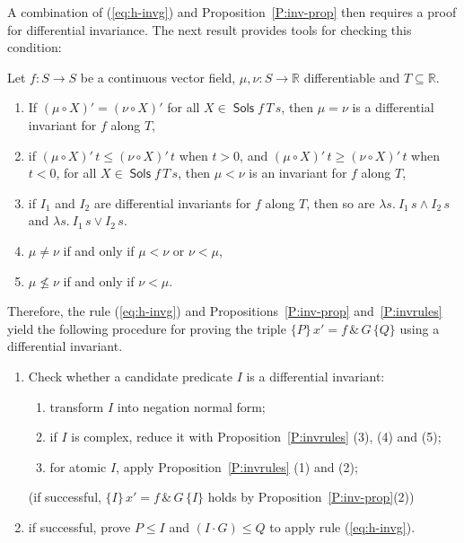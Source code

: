 \documentclass[envcountsames]{llncs}
\newcommand{\reals}{\mathbb{R}}
\newcommand{\Sols}{\mathop{\mathsf{Sols}}}
\begin{document}
A combination of (\ref{eq:h-invg}) and Proposition~\ref{P:inv-prop} then requires a proof for differential invariance. The next result provides tools for checking this condition:

\begin{proposition}\label{P:invrules}
  Let $f:S\to S$ be a continuous vector field, $\mu,\nu:S\to\reals$
  differentiable and $T\subseteq \reals$. 
\begin{enumerate}
\item If $(\mu\circ X)' =(\nu\circ X)'$ for all $X\in \Sols f\, T\, s$, then $\mu = \nu$ is a differential invariant for $f$ along $T$,
\item if $(\mu\circ X)'\, t\leq(\nu\circ X)'\, t$ when $t> 0$, and $(\mu\circ X)'\, t\geq(\nu\circ X)'\, t$ when $t< 0$, for all $X\in \Sols f\, T\, s$,
  then $\mu < \nu$ is an invariant for $f$ along $T$,
\item if $I_1$ and $I_2$ are differential invariants for $f$ along $T$, then so are $\lambda s.\ I_1\, s \land I_2\, s$ and $\lambda s.\ I_1\, s \lor I_2\, s$.
\item $\mu\neq \nu$ if and only if $\mu < \nu$ or $\nu < \mu$,
\item $\mu \not\le \nu$ if and only if $\nu < \mu$.
\end{enumerate}
\end{proposition}

Therefore, the rule (\ref{eq:h-invg}) and Propositions~\ref{P:inv-prop} and~\ref{P:invrules} yield the following procedure for proving the triple $\{P\}\, x' = f\, \&\, G\, \{Q\}$ using a differential invariant.
\begin{enumerate}
\item Check whether a candidate predicate $I$ is a differential invariant:
	\begin{enumerate}
	\item transform $I$ into negation normal form;
	\item if $I$ is complex, reduce it with Proposition~\ref{P:invrules} (3), (4) and (5);
	\item for atomic $I$, apply Proposition~\ref{P:invrules} (1) and (2);
	\end{enumerate}
(if successful,  $\{I\}\, x' = f\, \&\, G\, \{I\}$ holds by Proposition~\ref{P:inv-prop}(2))
\item if successful, prove $P\le I$ and $(I\cdot G)\le Q$ to apply rule (\ref{eq:h-invg}).
\end{enumerate}
\end{document}
